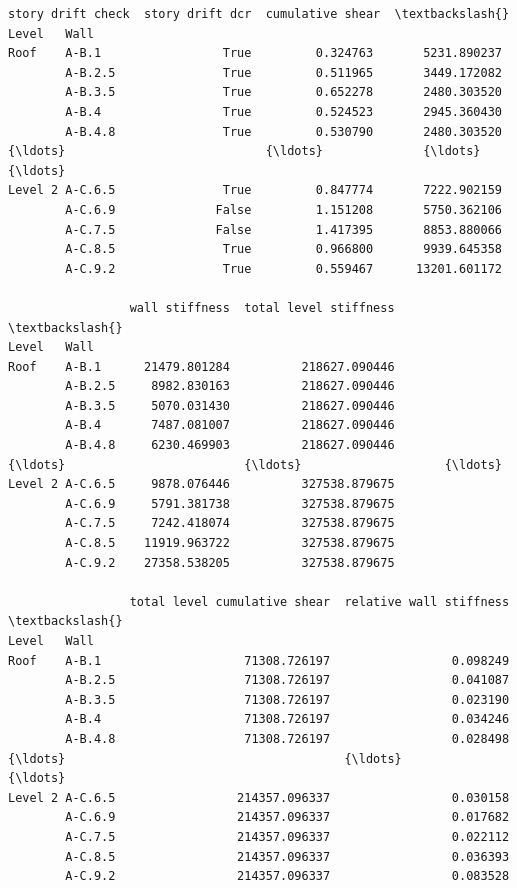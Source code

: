 \documentclass[11pt]{article}
\begin{document}
\begin{tcolorbox}[breakable, size=fbox, boxrule=.5pt, pad at break*=1mm, opacityfill=0]
\begin{Verbatim}[commandchars=\\\{\}]
                 story drift check  story drift dcr  cumulative shear  \textbackslash{}
Level   Wall
Roof    A-B.1                 True         0.324763       5231.890237
        A-B.2.5               True         0.511965       3449.172082
        A-B.3.5               True         0.652278       2480.303520
        A-B.4                 True         0.524523       2945.360430
        A-B.4.8               True         0.530790       2480.303520
{\ldots}                            {\ldots}              {\ldots}               {\ldots}
Level 2 A-C.6.5               True         0.847774       7222.902159
        A-C.6.9              False         1.151208       5750.362106
        A-C.7.5              False         1.417395       8853.880066
        A-C.8.5               True         0.966800       9939.645358
        A-C.9.2               True         0.559467      13201.601172

                 wall stiffness  total level stiffness  \textbackslash{}
Level   Wall
Roof    A-B.1      21479.801284          218627.090446
        A-B.2.5     8982.830163          218627.090446
        A-B.3.5     5070.031430          218627.090446
        A-B.4       7487.081007          218627.090446
        A-B.4.8     6230.469903          218627.090446
{\ldots}                         {\ldots}                    {\ldots}
Level 2 A-C.6.5     9878.076446          327538.879675
        A-C.6.9     5791.381738          327538.879675
        A-C.7.5     7242.418074          327538.879675
        A-C.8.5    11919.963722          327538.879675
        A-C.9.2    27358.538205          327538.879675

                 total level cumulative shear  relative wall stiffness  \textbackslash{}
Level   Wall
Roof    A-B.1                    71308.726197                 0.098249
        A-B.2.5                  71308.726197                 0.041087
        A-B.3.5                  71308.726197                 0.023190
        A-B.4                    71308.726197                 0.034246
        A-B.4.8                  71308.726197                 0.028498
{\ldots}                                       {\ldots}                      {\ldots}
Level 2 A-C.6.5                 214357.096337                 0.030158
        A-C.6.9                 214357.096337                 0.017682
        A-C.7.5                 214357.096337                 0.022112
        A-C.8.5                 214357.096337                 0.036393
        A-C.9.2                 214357.096337                 0.083528


\end{Verbatim}
\end{tcolorbox}
\end{document}
